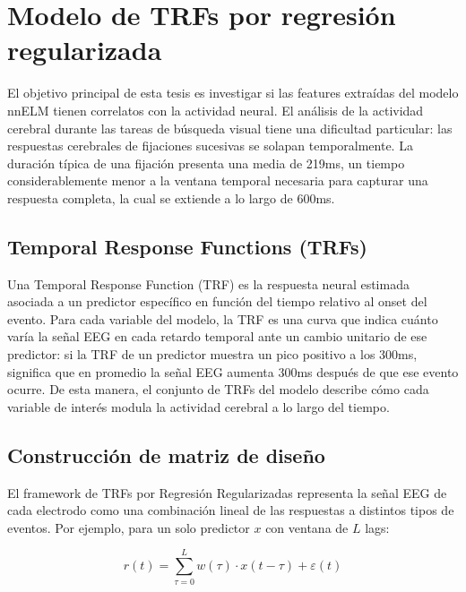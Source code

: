\section{Modelo de TRFs por regresión regularizada}
\label{sec:modelo_regresion}


El objetivo principal de esta tesis es investigar si las features extraídas del modelo nnELM tienen correlatos con la actividad neural. El análisis de la actividad cerebral durante las tareas de búsqueda visual tiene una dificultad particular: las respuestas cerebrales de fijaciones sucesivas se solapan temporalmente. La duración típica de una fijación presenta una media de 219ms, un tiempo considerablemente menor a la ventana temporal necesaria para capturar una respuesta completa, la cual se extiende a lo largo de 600ms.

\subsection{Temporal Response Functions (TRFs)}

Una Temporal Response Function (TRF) es la respuesta neural estimada asociada a un predictor específico en función del tiempo relativo al onset del evento.  Para cada variable del modelo, la TRF es una curva que indica cuánto varía la señal EEG en cada retardo temporal ante un cambio unitario de ese predictor: si la TRF de un predictor muestra un pico positivo a los 300ms, significa que en promedio la señal EEG aumenta 300ms después de que ese evento ocurre. De esta manera, el conjunto de TRFs del modelo describe cómo cada variable de interés modula la actividad cerebral a lo largo del tiempo.

\subsection{Construcción de matriz de diseño}

El framework de TRFs por Regresión Regularizadas representa la señal EEG de cada electrodo como una combinación lineal de las respuestas a distintos tipos de eventos. Por ejemplo, para un solo predictor $x$ con ventana de $L$ lags:

\begin{equation}
r(t) = \sum_{\tau=0}^{L} w(\tau) \cdot x(t - \tau) + \varepsilon(t)
\end{equation}

